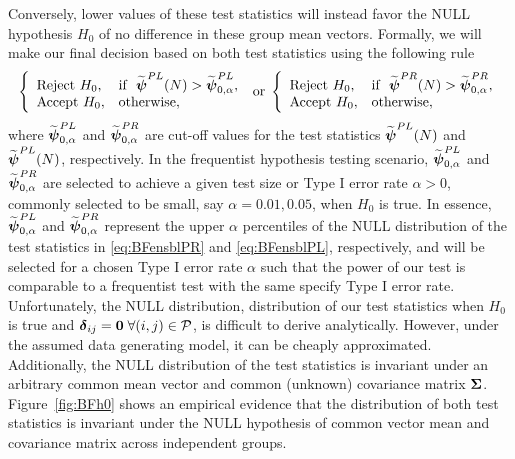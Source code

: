 \documentclass[times,sort&compress,3p]{elsarticle}
\theoremstyle{plain}%
\theoremstyle{definition}
\def\bzero{{\mathbf 0}}
\def\be{\begin{eqnarray}}
\def\ee{\end{eqnarray}}
\def\boldpsi{{\mbox{\boldmath $\psi$}}}
\def\bzero{{\mathbf 0}}
\newcommand{\udelta}            {\mbox{\boldmath$\delta$}}
\newcommand{\uSigma}            {\mbox{\boldmath$\Sigma$}}
\begin{document}
Conversely, lower values of these test statistics will instead favor the NULL hypothesis $H_0$ of no difference in these group mean vectors. Formally, we will make our final decision based on both test statistics using the following rule
\be
 \left \{
       \begin{array}{llll}
       \mbox{Reject}~ H_{0}, & \mbox{if} ~~ \widetilde{\boldpsi}^{PL}(N) > \widetilde{\boldpsi}^{PL}_{0, \alpha},  \\
       \mbox{Accept}~ H_{0}, & \mbox{otherwise}, %
       \end{array}
       \right. \; \mbox{or}\;
  \left \{
       \begin{array}{llll}
       \mbox{Reject}~ H_{0}, & \mbox{if} ~~ \widetilde{\boldpsi}^{PR}(N) > \widetilde{\boldpsi}^{PR}_{0, \alpha},  \\
       \mbox{Accept}~ H_{0}, & \mbox{otherwise}, \label{eq:eqBFfin}
       \end{array}
       \right.     
\ee
where $\widetilde{\boldpsi}^{PL}_{0, \alpha}$ and $\widetilde{\boldpsi}^{PR}_{0, \alpha}$ are  cut-off values for the test statistics $\widetilde{\boldpsi}^{PL}(N)$ and $\widetilde{\boldpsi}^{PL}(N)$, respectively. In the frequentist hypothesis testing scenario, $\widetilde{\boldpsi}^{PL}_{0, \alpha}$ and $\widetilde{\boldpsi}^{PR}_{0, \alpha}$ are selected to achieve a given test size or Type I error rate $\alpha > 0$, commonly selected to be small, say $\alpha  = 0.01, 0.05$, when $H_0$ is true. In essence, $\widetilde{\boldpsi}^{PL}_{0, \alpha}$ and $\widetilde{\boldpsi}^{PR}_{0, \alpha}$ represent the upper $\alpha$ percentiles of the NULL distribution of the test statistics in \eqref{eq:BFensblPR} and \eqref{eq:BFensblPL}, respectively, and will be selected for a chosen Type I error rate $\alpha$ such that the power of our test is comparable to a frequentist test with the same specify Type I error rate.  
Unfortunately, the NULL distribution, distribution of our test statistics when $H_0$ is true and $\udelta_{ij} = \bzero\; \forall(i,j) \in \mathcal{P}$, is difficult to derive analytically. However, under the assumed data generating model, it can be cheaply approximated. Additionally, the NULL distribution of the test statistics is invariant under an arbitrary common mean vector and common (unknown) covariance matrix $\uSigma$. Figure~\ref{fig:BFh0} shows an empirical evidence that the distribution of both test statistics is invariant under the NULL hypothesis of common vector mean and covariance matrix across independent groups. 
\end{document}
